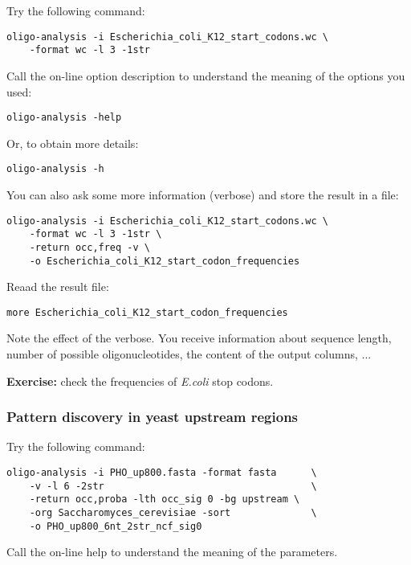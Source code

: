 Try the following command:

\begin{verbatim}
oligo-analysis -i Escherichia_coli_K12_start_codons.wc \
    -format wc -l 3 -1str
\end{verbatim}

Call the on-line option description to understand the meaning of the options you used:
\begin{verbatim}
oligo-analysis -help
\end{verbatim}

Or, to obtain more details:
\begin{verbatim}
oligo-analysis -h
\end{verbatim}


You can also ask some more information (verbose) and store the result
in a file:

\begin{verbatim}
oligo-analysis -i Escherichia_coli_K12_start_codons.wc \
    -format wc -l 3 -1str \
    -return occ,freq -v \
    -o Escherichia_coli_K12_start_codon_frequencies
\end{verbatim}

Reaad the result file:

\begin{verbatim}
more Escherichia_coli_K12_start_codon_frequencies
\end{verbatim}

Note the effect of the verbose. You receive information about sequence
length, number of possible oligonucleotides, the content of the output
columns, ...

\textbf{Exercise:} check the frequencies of \textit{E.coli} stop codons.

\subsubsection{Pattern discovery in yeast upstream regions}

Try the following command:

\begin{verbatim} 
oligo-analysis -i PHO_up800.fasta -format fasta      \
    -v -l 6 -2str                                    \
    -return occ,proba -lth occ_sig 0 -bg upstream \
    -org Saccharomyces_cerevisiae -sort              \
    -o PHO_up800_6nt_2str_ncf_sig0 
\end{verbatim}

Call the on-line help to understand the meaning of the parameters.

